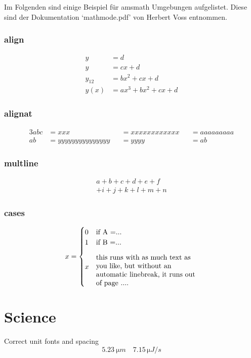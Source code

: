 Im Folgenden sind einige Beispiel für amsmath Umgebungen aufgelistet. Diese 
sind der Dokumentation `mathmode.pdf' von Herbert Voss entnommen.

\subsubsection{align}
\begin{align}
y      & = d\\
y      & = cx + d\\
y_{12} & = bx^{2} + cx + d\\
y(x)   & = ax^{3} + bx^{2}+ cx + d
\end{align}

\subsubsection{alignat}
\begin{alignat}{3}
abc   &= xxx &&= xxxxxxxxxxxx &&= aaaaaaaaa \\
ab    &= yyyyyyyyyyyyyyy &&= yyyy &&= ab
\end{alignat}

\subsubsection{multline}

\begin{multline}
a+b+c+d+e+f\\
+i+j+k+l+m+n
\end{multline}

\subsubsection{cases}
\begin{equation}
x = \begin{cases}
   0 & \text{if A =...}\\
   1 & \text{if B =...}\\
   x & \parbox{5 cm}{%
\flushleft %
this runs with as much text as you like,
but without an automatic linebreak,
it runs out of page ....} %
\end{cases}
\end{equation}


\section{Science}
Correct unit fonts and spacing
\begin{equation}
	\SI{5.23}{\micro m} \quad 7.15\,\si{\micro J/s}
\end{equation}



